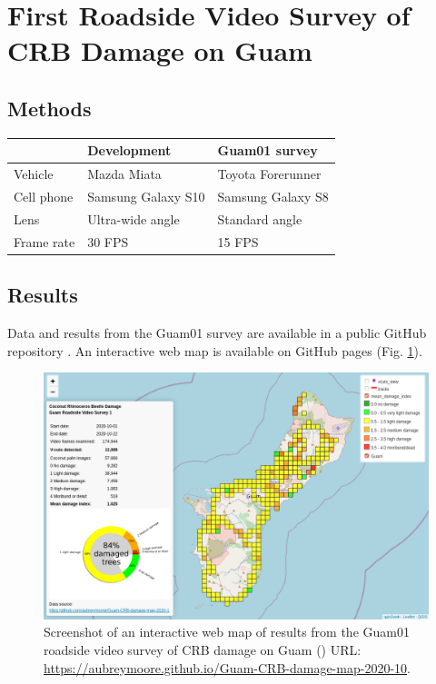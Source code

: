 \documentclass[12pt,letterpaper,english,bibliography=totocnumbered, abstract=on]{scrartcl}
\begin{document}
\section{First Roadside Video Survey of CRB Damage on Guam}

\subsection{Methods}

\begin{tabular}{|l|l|l|}
	\hline 
	& \textbf{Development} & \textbf{Guam01 survey} \\ 
	\hline 
	Vehicle & Mazda Miata & Toyota Forerunner \\ 
	\hline 
	Cell phone & Samsung Galaxy S10 & Samsung Galaxy S8 \\ 
    \hline 
	Lens & Ultra-wide angle & Standard angle \\
	\hline
	Frame rate & 30 FPS & 15 FPS \\
\hline
\end{tabular} 

\subsection{Results}

Data and results from the Guam01 survey are available in a public GitHub repository \cite{mooreGitHubRepositoryGuamCRBdamagemap2020102020}. An interactive web map is available on GitHub pages (Fig. \ref{fig:guam01webmap}).

\begin{figure}[H]
	\centering
	\includegraphics[width=\linewidth]{images/Guam01-webmap}
	\caption{Screenshot of an interactive web map of results from the Guam01 roadside video survey of CRB damage on Guam (\cite{mooreWebMapGuamCRBdamagemap2020102020}) URL: \url{https://aubreymoore.github.io/Guam-CRB-damage-map-2020-10}.}
	\label{fig:guam01webmap}
\end{figure}
\end{document}
